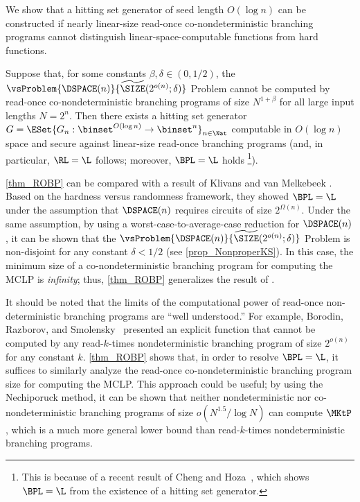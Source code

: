 \documentclass{toc}
\begin{document}
We show that a hitting set generator of seed length $O(\log n)$ can be constructed
if
nearly linear-size read-once co-nondeterministic branching programs
cannot distinguish linear-space-computable functions
from
hard functions.

\begin{theorem}
  \label{thm_ROBP}
  Suppose that,
  for some constants $\beta, \delta \in (0, 1/2)$,
  the $\vsProblem{\DSPACE(n)} { \widetilde{\SIZE}(2^{o(n)}; \delta) }$ Problem cannot
  be computed by read-once co-nondeterministic branching programs of size $N^{1 + \beta}$
  for all large input lengths $N = 2^n$.
  Then there exists a hitting set generator $G = \ESet{ G_n : \binset^{O(\log n)} \allowbreak \to \binset^n }_{n \in \Nat} $ computable in $O(\log n)$ space and secure against linear-size read-once branching programs (and, in particular, $\RL = \L$ follows; moreover, $\BPL = \L$ holds%
  \footnote{This is because of a recent result of Cheng and Hoza~\cite{ChengH20_coco_conf}, which shows $\BPL = \L$
    from the existence of a hitting set generator.}).
\end{theorem}

\cref{thm_ROBP} can be compared with a result of
Klivans and van Melkebeek \cite{KlivansM02_siamcomp_journals}.
Based on the hardness versus randomness framework,
they showed
$\BPL = \L$
under the assumption that $\DSPACE(n)$ requires
%
circuits  %
of size $2^{\Omega(n)}$.
Under the same assumption, by using a worst-case-to-average-case reduction for $\DSPACE(n)$,
it can be shown that the
$\vsProblem{\DSPACE(n)} { \widetilde{\SIZE}(2^{o(n)}; \delta) }$ Problem
is non-disjoint for any constant $\delta < 1 / 2$
%
(see \cref{prop_NonproperKS}).   %
In this case, the minimum size of a co-nondeterministic branching program for computing the MCLP is \emph{infinity};
thus, \cref{thm_ROBP} generalizes the result of \cite{KlivansM02_siamcomp_journals}.

It should be noted that
the   %
limits of
the computational power of read-once non-deterministic branching programs
are ``well understood.''
For example,
Borodin, Razborov, and Smolensky~\cite{BorodinRS93_cc_journals}
presented an explicit function that cannot be computed by any read-$k$-times
nondeterministic branching program of size $2^{o(n)}$
for any constant $k$.
\cref{thm_ROBP} shows that,
in order to resolve $\BPL = \L$,
it suffices to similarly analyze the read-once co-nondeterministic branching program size for computing the MCLP.
This approach could be useful; by using the Nechiporuck method, it can be shown that
neither nondeterministic nor co-nondeterministic branching programs of size $o(N^{1.5}/\log N)$
can compute $\MKtP$ \cite{CheraghchiHMY20}, which is a much more general lower bound than read-$k$-times nondeterministic branching programs.
\end{document}

